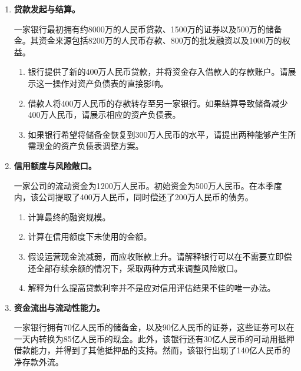 

\begin{enumerate}

\item \textbf{贷款发起与结算。}

一家银行最初拥有约8000万的人民币贷款、1500万的证券以及500万的储备金。其资金来源包括8200万的人民币存款、800万的批发融资以及1000万的权益。

\begin{enumerate}

\item 银行提供了新的400万人民币贷款，并将资金存入借款人的存款账户。请展示这一操作对资产负债表的直接影响。

\item 借款人将400万人民币的存款转存至另一家银行。如果结算导致储备减少400万人民币，请展示相应的资产负债表。

\item 如果银行希望将储备金恢复到300万人民币的水平，请提出两种能够产生所需现金的资产负债表调整方案。

\end{enumerate}

\item \textbf{信用额度与风险敞口。}

一家公司的流动资金为1200万人民币。初始资金为500万人民币。在本季度内，该公司提取了400万人民币，同时偿还了200万人民币的债务。

\begin{enumerate}
\item 计算最终的融资规模。
\item 计算在信用额度下未使用的金额。
\item 假设运营现金流减弱，而应收账款上升。请解释银行可以在不需要立即偿还全部存续余额的情况下，采取两种方式来调整风险敞口。
\item 解释为什么提高贷款利率并不是应对信用评估结果不佳的唯一办法。
\end{enumerate}

\item \textbf{资金流出与流动性能力。}

一家银行拥有70亿人民币的储备金，以及90亿人民币的证券，这些证券可以在一天内转换为85亿人民币的现金。此外，该银行还有30亿人民币的可动用抵押借款能力，并得到了其他抵押品的支持。然而，该银行出现了140亿人民币的净存款外流。


\end{enumerate}
